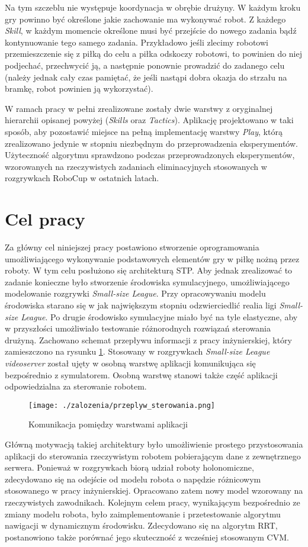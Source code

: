 \begin{enumerate}
  Na tym szczeblu nie występuje koordynacja w obrębie drużyny. W każdym kroku gry powinno być określone jakie zachowanie ma wykonywać robot. Z każdego \textit{Skill}, w każdym momencie określone musi być przejście
  do nowego zadania bądź kontynuowanie tego samego zadania. Przykładowo jeśli zlecimy robotowi przemieszczenie się z piłką do celu a piłka 
  odskoczy robotowi, to powinien do niej podjechać, przechwycić ją, a następnie ponownie prowadzić do zadanego celu (należy jednak cały czas pamiętać, że jeśli nastąpi dobra okazja do strzału
na bramkę, robot powinien ją wykorzystać).
\end{enumerate}

 W ramach pracy w pełni zrealizowane zostały dwie warstwy z oryginalnej hierarchii opisanej powyżej (\textit{Skills} oraz \textit{Tactics}). Aplikację projektowano w taki sposób, aby pozostawić miejsce
 na pełną implementację warstwy \textit{Play}, którą zrealizowano jedynie w stopniu niezbędnym do przeprowadzenia eksperymentów.
Użyteczność algorytmu sprawdzono podczas przeprowadzonych eksperymentów, wzorowanych na rzeczywistych zadaniach eliminacyjnych stosowanych w rozgrywkach RoboCup w ostatnich latach.

\section{Cel pracy}
Za główny cel niniejszej pracy postawiono stworzenie oprogramowania umożliwiającego wykonywanie podstawowych elementów gry w piłkę nożną przez roboty. W tym celu posłużono się architekturą STP. Aby jednak zrealizować to zadanie konieczne było
stworzenie środowiska symulacyjnego, umożliwiającego modelowanie rozgrywki \emph{Small-size League}. Przy opracowywaniu modelu środowiska starano się w jak największym stopniu odzwierciedlić realia
ligi \emph{Small-size League}. Po drugie środowisko symulacyjne miało być na tyle elastyczne, aby w przyszłości umożliwiało testowanie różnorodnych rozwiązań sterowania drużyną.
Zachowano schemat przepływu informacji z pracy inżynierskiej, który zamieszczono na rysunku \ref{fig:przeplyw_sterowania}. Stosowany w rozgrywkach \emph{Small-size League} \textit{videoserver} został
ujęty w osobną warstwę  aplikacji komunikująca się bezpośrednio z symulatorem. Osobną warstwę stanowi także część aplikacji odpowiedzialna za sterowanie robotem.
\begin{figure}[H]
\centering
\texttt{[image: ./zalozenia/przeplyw\_sterowania.png]}
\caption{Komunikacja pomiędzy warstwami aplikacji} \label{fig:przeplyw_sterowania}
\end{figure}
Główną motywacją takiej architektury było umożliwienie prostego przystosowania aplikacji do sterowania rzeczywistym robotem pobierającym dane z zewnętrznego serwera. 
Ponieważ w rozgrywkach biorą udział roboty holonomiczne, zdecydowano się na odejście od modelu robota o napędzie różnicowym stosowanego w pracy inżynierskiej. Opracowano zatem nowy model wzorowany na rzeczywistych
zawodnikach.
Kolejnym celem pracy, wynikającym bezpośrednio ze zmiany modelu robota, było zaimplementowanie i przetestowanie algorytmu nawigacji w dynamicznym środowisku. Zdecydowano się na algorytm RRT,
postanowiono także porównać jego skuteczność z wcześniej stosowanym CVM.

